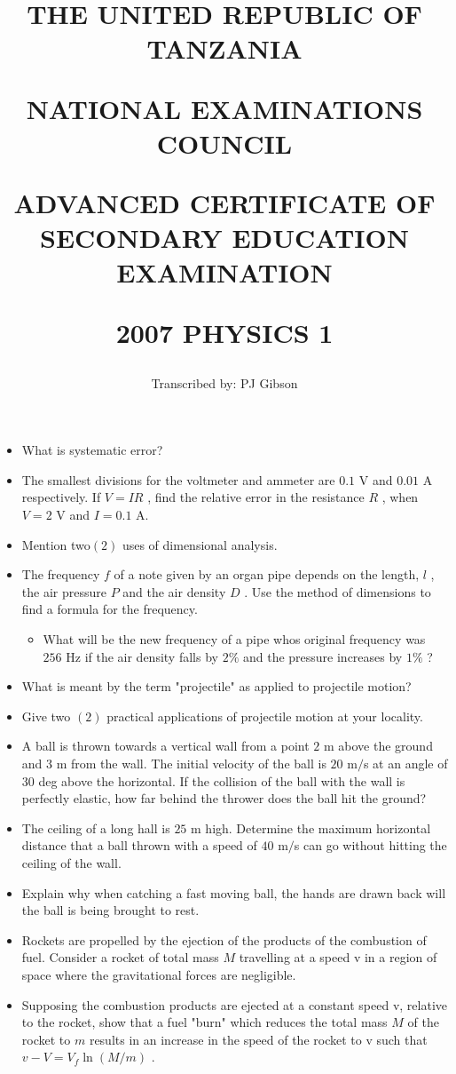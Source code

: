 \documentclass{article}
\title{THE UNITED REPUBLIC OF TANZANIA

NATIONAL EXAMINATIONS COUNCIL

ADVANCED CERTIFICATE OF SECONDARY EDUCATION EXAMINATION

\textbf{2007 PHYSICS 1}}
\author{Transcribed by:  PJ Gibson}
\begin{document}
\maketitle

\begin{itemize}
\item What is systematic error?
\item The smallest divisions for the voltmeter and ammeter are $ 0.1$ V and $ 0.01$ A respectively.  If $ V=IR$ , find the relative error in the resistance $ R$ , when $ V=2$ V and $ I=0.1$ A.
\item Mention two$ (2)$ uses of dimensional analysis.
\item The frequency $ f$ of a note given by an organ pipe depends on the length, $ l$ , the air pressure $ P$ and the air density $ D$ .  Use the method of dimensions to find a formula for the frequency.
 \begin{itemize}
\item What will be the new frequency of a pipe whos original frequency was $ 256$ Hz if the air density falls by $ 2\%$ and the pressure increases by $ 1\%$ ?
\end{itemize}
\item What is meant by the term "projectile" as applied to projectile motion?
\item Give two $ (2)$ practical applications of projectile motion at your locality.
\item A ball is thrown towards a vertical wall from a point $ 2$ m above the ground and $ 3$ m from the wall.  The initial velocity of the ball is $ 20$ m$/$s at an angle of $ 30$ deg above the horizontal.  If the collision of the ball with the wall is perfectly elastic, how far behind the thrower does the ball hit the ground?
\item The ceiling of a long hall is $ 25$ m high.  Determine the maximum horizontal distance that a ball thrown with a speed of $ 40$ m$/$s can go without hitting the ceiling of the wall.
\item Explain why when catching a fast moving ball, the hands are drawn back will the ball is being brought to rest.
\item Rockets are propelled by the ejection of the products of the combustion of fuel.  Consider a rocket of total mass $ M$ travelling at a speed v in a region of space where the gravitational forces are negligible.  
\item Supposing the combustion products are ejected at a constant speed v, relative to the rocket, show that a fuel "burn" which reduces the total mass $ M$ of the rocket to $ m$ results in an increase in the speed of the rocket to v such that $ v-V=V_{f} \ln (M/m)$ .

\end{itemize}
\end{document}
